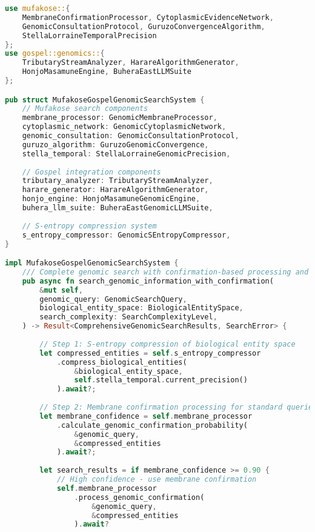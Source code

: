 \documentclass[12pt,a4paper]{article}
\begin{document}
\begin{lstlisting}[language=Rust, caption=Integrated Mufakose-Gospel Genomic Search System]
use mufakose::{
    MembraneConfirmationProcessor, CytoplasmicEvidenceNetwork,
    GenomicConsultationProtocol, GuruzoConvergenceAlgorithm,
    StellaLorraineTemporalPrecision
};
use gospel::genomics::{
    TributaryStreamAnalyzer, HarareAlgorithmGenerator,
    HonjoMasamuneEngine, BuheraEastLLMSuite
};

pub struct MufakoseGospelGenomicSearchSystem {
    // Mufakose search components
    membrane_processor: GenomicMembraneProcessor,
    cytoplasmic_network: GenomicCytoplasmicNetwork,
    genomic_consultation: GenomicConsultationProtocol,
    guruzo_algorithm: GuruzoGenomicConvergence,
    stella_temporal: StellaLorraineGenomicPrecision,
    
    // Gospel integration components  
    tributary_analyzer: TributaryStreamAnalyzer,
    harare_generator: HarareAlgorithmGenerator,
    honjo_engine: HonjoMasamuneGenomicEngine,
    buhera_llm_suite: BuheraEastGenomicLLMSuite,
    
    // S-entropy compression system
    s_entropy_compressor: GenomicSEntropyCompressor,
}

impl MufakoseGospelGenomicSearchSystem {
    /// Complete genomic search with confirmation-based processing and truth reconstruction
    pub async fn search_genomic_information_with_confirmation(
        &mut self,
        genomic_query: GenomicSearchQuery,
        biological_entity_space: BiologicalEntitySpace,
        search_complexity: SearchComplexityLevel,
    ) -> Result<ComprehensiveGenomicSearchResults, SearchError> {
        
        // Step 1: S-entropy compression of biological entity space
        let compressed_entities = self.s_entropy_compressor
            .compress_biological_entities(
                &biological_entity_space,
                self.stella_temporal.current_precision()
            ).await?;
        
        // Step 2: Membrane confirmation processing for standard queries
        let membrane_confidence = self.membrane_processor
            .calculate_genomic_confirmation_probability(
                &genomic_query,
                &compressed_entities
            ).await?;
        
        let search_results = if membrane_confidence >= 0.90 {
            // High confidence - use membrane confirmation
            self.membrane_processor
                .process_genomic_confirmation(
                    &genomic_query,
                    &compressed_entities
                ).await?
                

\end{lstlisting}
\end{document}
